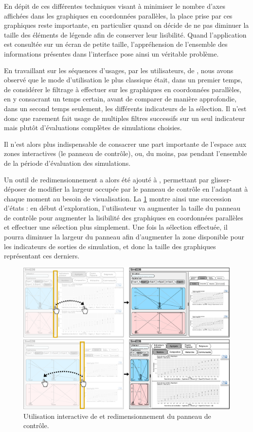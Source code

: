 En dépit de ces différentes techniques visant à minimiser le nombre d'axes affichées dans les graphiques en coordonnées parallèles, la place prise par ces graphiques reste importante, en particulier quand on décide de ne pas diminuer la taille des éléments de légende afin de conserver leur lisibilité.
Quand l'application est consultée sur un écran de petite taille, l'appréhension de l'ensemble des informations présentes dans l'interface pose ainsi un véritable problème.

En travaillant sur les séquences d'usages, par les utilisateurs, de \simedb{}, nous avons observé que le mode d'utilisation le plus classique était, dans un premier temps, de considérer le filtrage à effectuer sur les graphiques en coordonnées parallèles, en y consacrant un temps certain, avant de comparer de manière approfondie, dans un second temps seulement, les différents indicateurs de la sélection.
Il n'est donc que rarement fait usage de multiples filtres successifs sur un seul indicateur mais plutôt d'évaluations complètes de simulations choisies.

Il n'est alors plus indispensable de consacrer une part importante de l'espace aux zones interactives (le panneau de contrôle), ou, du moins, pas pendant l'ensemble de la période d'évaluation des simulations.

Un outil de redimensionnement a alors été ajouté à \simedb{}, permettant par glisser-déposer de modifier la largeur occupée par le panneau de contrôle en l'adaptant à chaque moment au besoin de visualisation.
La \cref{fig:resizing} montre ainsi une succession d'états : en début d'exploration, l'utilisateur va augmenter la taille du panneau de contrôle pour augmenter la lisibilité des graphiques en coordonnées parallèles et effectuer une sélection plus simplement.
Une fois la sélection effectuée, il pourra diminuer la largeur du panneau afin d'augmenter la zone disponible pour les indicateurs de sorties de simulation, et donc la taille des graphiques représentant ces derniers. 

\begin{figure}[H]
	\centering
	\includegraphics[width=\linewidth]{img/mockup_SimEDB_resize.pdf}
	\caption{Utilisation interactive de \simedb{} et redimensionnement du panneau de contrôle.}
	\label{fig:resizing}
\end{figure}

